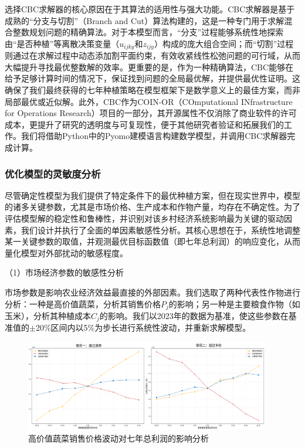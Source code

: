 \documentclass[withoutpreface,bwprint]{cumcmthesis} %
\begin{document}
选择CBC求解器的核心原因在于其算法的适用性与强大功能。CBC求解器是基于成熟的“分支与切割”（Branch and Cut）算法构建的，这是一种专门用于求解混合整数规划问题的精确算法。对于本模型而言，“分支”过程能够系统性地探索由“是否种植”等离散决策变量（$u_{ijky}$和$z_{ijy}$）构成的庞大组合空间；而“切割”过程则通过在求解过程中动态添加割平面约束，有效收紧线性松弛问题的可行域，从而大幅提升寻找最优整数解的效率。更重要的是，作为一种精确算法，CBC能够在给予足够计算时间的情况下，保证找到问题的全局最优解，并提供最优性证明。这确保了我们最终获得的七年种植策略在模型框架下是数学意义上的最佳方案，而非局部最优或近似解。此外，CBC作为COIN-OR（COmputational INfrastructure for Operations Research）项目的一部分，其开源属性不仅消除了商业软件的许可成本，更提升了研究的透明度与可复现性，便于其他研究者验证和拓展我们的工作。我们将借助Python中的Pyomo建模语言构建数学模型，并调用CBC求解器完成计算。

\subsubsection{优化模型的灵敏度分析}
尽管确定性模型为我们提供了特定条件下的最优种植方案，但在现实世界中，模型的诸多关键参数，尤其是市场价格、生产成本和作物产量，均存在不确定性。为了评估模型解的稳定性和鲁棒性，并识别对该乡村经济系统影响最为关键的驱动因素，我们设计并执行了全面的单因素敏感性分析。其核心思想在于，系统性地调整某一关键参数的取值，并观测最优目标函数值（即七年总利润）的响应变化，从而量化模型对外部扰动的敏感程度。


（1）市场经济参数的敏感性分析

市场参数是影响农业经济效益最直接的外部因素。我们选取了两种代表性作物进行分析：一种是高价值蔬菜，分析其销售价格$P_j$的影响；另一种是主要粮食作物（如玉米），分析其种植成本$C_j$的影响。我们以2023年的数据为基准，使这些参数在基准值的$\pm$20\%区间内以5\%为步长进行系统性波动，并重新求解模型。

\begin{figure}[htbp]
    \centering
    \includegraphics[width=0.95\textwidth]{figures/1_1.png}
    \caption{高价值蔬菜销售价格波动对七年总利润的影响分析}
    \label{fig:1_1}
\end{figure}
\end{document}
